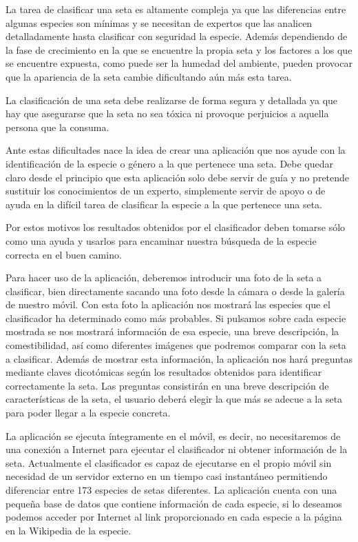 
La tarea de clasificar una seta es altamente compleja ya que las diferencias entre algunas especies son mínimas y se necesitan de expertos que las analicen detalladamente hasta clasificar con seguridad la especie. Además dependiendo de la fase de crecimiento en la que se encuentre la propia seta y los factores a los que se encuentre expuesta, como puede ser la humedad del ambiente, pueden provocar que la apariencia de la seta cambie dificultando aún más esta tarea. 

La clasificación de una seta debe realizarse de forma segura y detallada ya que hay que asegurarse que la seta no sea tóxica ni provoque perjuicios a aquella persona que la consuma.

Ante estas dificultades nace la idea de crear una aplicación que nos ayude con la identificación de la especie o género a la que pertenece una seta. Debe quedar claro desde el principio que esta aplicación solo debe servir de guía y no pretende sustituir los conocimientos de un experto, simplemente servir de apoyo o de ayuda en la difícil tarea de clasificar la especie a la que pertenece una seta. 

Por estos motivos los resultados obtenidos por el clasificador deben tomarse sólo como una ayuda y usarlos para encaminar nuestra búsqueda de la especie correcta en el buen camino.

Para hacer uso de la aplicación, deberemos introducir una foto de la seta a clasificar, bien directamente sacando una foto desde la cámara o desde la galería de nuestro móvil. Con esta foto la aplicación nos mostrará las especies que el clasificador ha determinado como más probables. Si pulsamos sobre cada especie mostrada se nos mostrará información de esa especie, una breve descripción, la comestibilidad, así como diferentes imágenes que podremos comparar con la seta a clasificar. Además de mostrar esta información, la aplicación nos hará preguntas mediante claves dicotómicas según los resultados obtenidos para identificar correctamente la seta. Las preguntas consistirán en una breve descripción de características de la seta, el usuario deberá elegir la que más se adecue a la seta para poder llegar a la especie concreta.

La aplicación se ejecuta íntegramente en el móvil, es decir, no necesitaremos de una conexión a Internet para ejecutar el clasificador ni obtener información de la seta. Actualmente el clasificador es capaz de ejecutarse en el propio móvil sin necesidad de un servidor externo en un tiempo casi instantáneo permitiendo diferenciar entre 173 especies de setas diferentes. La aplicación cuenta con una pequeña base de datos que contiene información de cada especie, si lo deseamos podemos acceder por Internet al link proporcionado en cada especie a la página en la Wikipedia de la especie.
